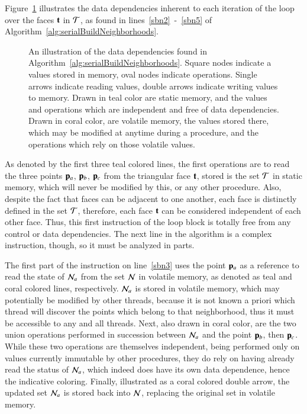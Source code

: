 Figure~\ref{fig:sabnDataDependencies} illustrates the data dependencies inherent to each iteration of the loop over the faces $\mathbf{t}$ in $\mathcal{T}$, as found in lines~\ref{sbn2}~-~\ref{sbn5} of Algorithm~\ref{alg:serialBuildNeighborhoods}.


\begin{figure}[ht]
	
	{\caption[Data Dependencies in Serial Algorithm~\ref{alg:serialBuildNeighborhoods}: Build Neighborhoods]{An illustration of the data dependencies found in Algorithm~\ref{alg:serialBuildNeighborhoods}. Square nodes indicate a values stored in memory, oval nodes indicate operations. Single arrows indicate reading values, double arrows indicate writing values to memory. Drawn in teal color are static memory, and the values and operations which are independent and free of data dependencies. Drawn in coral color, are volatile memory, the values stored there, which may be modified at anytime during a procedure, and the operations which rely on those volatile values.}\label{fig:sabnDataDependencies}}
\end{figure}

As denoted by the first three teal colored lines, the first operations are to read the three points $\mathbf{p}_a$, $\mathbf{p}_b$, $\mathbf{p}_c$ from the triangular face $\mathbf{t}$, stored is the set $\mathcal{T}$ in static memory, which will never be modified by this, or any other procedure. Also, despite the fact that faces can be adjacent to one another, each face is distinctly defined in the set $\mathcal{T}$, therefore, each face $\mathbf{t}$ can be considered independent of each other face. Thus, this first instruction of the loop block is totally free from any control or data dependencies. The next line in the algorithm is a complex instruction, though, so it must be analyzed in parts.

The first part of the instruction on line~\ref{sbn3} uses the point $\mathbf{p}_a$ as a reference to read the state of $\mathcal{N}_a$ from the set $\mathcal{N}$ in volatile memory, as denoted as teal and coral colored lines, respectively. $\mathcal{N}_a$ is stored in volatile memory, which may potentially be modified by other threads, because it is not known a priori which thread will discover the points which belong to that neighborhood, thus it must be accessible to any and all threads. Next, also drawn in coral color, are the two union operations performed in succession between $\mathcal{N}_a$ and the point $\mathbf{p}_b$, then $\mathbf{p}_c$. While these two operations are themselves independent, being performed only on values currently immutable by other procedures, they do rely on having already read the status of $\mathcal{N}_a$, which indeed does have its own data dependence, hence the indicative coloring. Finally, illustrated as a coral colored double arrow, the updated set $\mathcal{N}_a$ is stored back into $\mathcal{N}$, replacing the original set in volatile memory.

